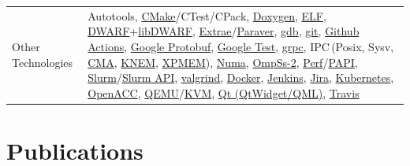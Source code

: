 \documentclass[a4paper,10pt]{article}
\begin{document}
\begin{tabularx}{\linewidth}{@{}l X@{}}
  Other Technologies & Autotools,
                       \href{https://cmake.org/}{CMake}/CTest/CPack,
                       \href{https://doxygen.nl/}{Doxygen},
                       \href{https://man7.org/linux/man-pages/man5/elf.5.html}{ELF},
                       \href{https://dwarfstd.org/}{DWARF}+\href{https://www.prevanders.net/libdwarfdoc/}{libDWARF},
                       \href{https://tools.bsc.es/extrae}{Extrae}/\href{https://tools.bsc.es/paraver}{Paraver},
                       \href{https://www.sourceware.org/gdb/}{gdb},
                       \href{https://git-scm.com/}{git},
                       \href{https://github.com/features/actions}{Github Actions},
                       \href{https://developers.google.com/protocol-buffers}{Google Protobuf},
                       \href{https://github.com/google/googletest}{Google Test},
                       \href{https://grpc.io/}{grpc},
                       IPC\,(Posix, Sysv,
                       \href{https://lwn.net/Articles/405284/}{CMA},
                       \href{https://knem.gitlabpages.inria.fr/}{KNEM},
                       \href{https://github.com/hpc/xpmem}{XPMEM}),
                       \href{https://www.kernel.org/doc/html/v4.19/vm/numa.html}{Numa},
                       \href{https://pm.bsc.es/ompss-2}{OmpSs-2},
                       \href{https://perf.wiki.kernel.org/index.php/Main_Page}{Perf}/\href{https://icl.utk.edu/papi/}{PAPI},
                       \href{https://slurm.schedmd.com/}{Slurm}/\href{https://slurm.schedmd.com/rest.html}{Slurm API},
                       \href{https://valgrind.org/}{valgrind},
                       \href{https://www.docker.com/}{Docker},
                       \href{https://www.jenkins.io/}{Jenkins},
                       \href{https://www.atlassian.com/es/software/jira}{Jira},
                       \href{https://kubernetes.io/}{Kubernetes},
                       \href{https://www.openacc.org/}{OpenACC},
                       \href{https://www.qemu.org/}{QEMU}/\href{https://www.linux-kvm.org/page/Main_Page}{KVM},
                       \href{https://www.qt.io/}{Qt (QtWidget/QML)},
                       \href{https://www.travis-ci.com/}{Travis} \\
\end{tabularx}

\section{Publications}
\begin{refsection}
    \nocite{*}
    \printbibliography[heading=none]
\end{refsection}


\vfill
{}
\end{document}
